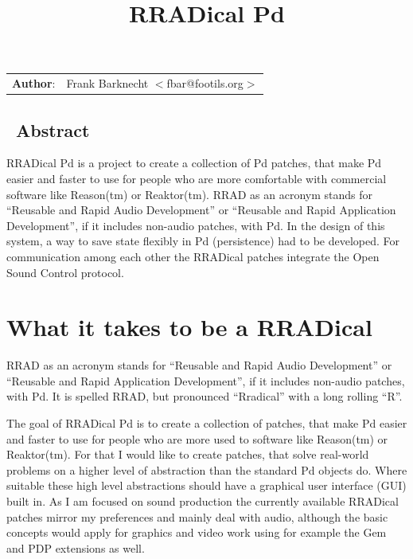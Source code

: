 \documentclass[10pt,english]{scrartcl}
\title{RRADical Pd}
\author{}
\date{}
\newlength{\docinfowidth}
\begin{document}
\maketitle

\begin{center}
\begin{tabularx}{\docinfowidth}{lX}
\textbf{Author}: &
	Frank Barknecht {$<$}fbar@footils.org{$>$} \\
\end{tabularx}
\end{center}
\subsection*{~\hfill Abstract\hfill ~}

RRADical Pd is a project to create a collection of Pd patches, that make
Pd easier and faster to use for people who are more comfortable with
commercial software like Reason(tm) or Reaktor(tm).  RRAD as an acronym
stands for ``Reusable and Rapid Audio Development'' or ``Reusable and Rapid
Application Development'', if it includes non-audio patches, with Pd. In
the design of this system, a way to save state flexibly in Pd
(persistence) had to be developed. For communication among each other
the RRADical patches integrate the Open Sound Control protocol.




\hypertarget{what-it-takes-to-be-a-rradical}{}
\section*{What it takes to be a RRADical}

RRAD as an acronym stands for ``Reusable and Rapid Audio Development'' or
``Reusable and Rapid Application Development'', if it includes non-audio
patches, with Pd. It is spelled RRAD, but pronounced ``Rradical'' with a
long rolling ``R''.

The goal of RRADical Pd is to create a collection of patches, that make Pd
easier and faster to use for people who are more used to software like
Reason(tm) or Reaktor(tm). For that I would like to create patches, that
solve real-world problems on a higher level of abstraction than the standard
Pd objects do.  Where suitable these high level abstractions should have a
graphical user interface (GUI) built in. As I am focused on sound production
the currently available RRADical patches mirror my preferences and mainly
deal with audio, although the basic concepts would apply for graphics and
video work using for example the Gem and PDP extensions as well.
\end{document}
